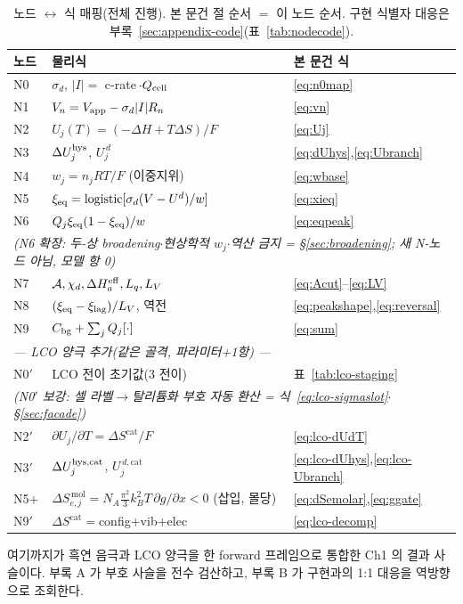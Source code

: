\begin{table}[t]
\centering
\renewcommand{\arraystretch}{1.3}
\caption{노드 $\leftrightarrow$ 식 매핑(전체 진행). 본 문건 절 순서 $=$ 이 노드 순서.
구현 식별자 대응은 부록~\ref{sec:appendix-code}(표~\ref{tab:nodecode}).}
\label{tab:nodemap}
\begin{tabular}{l l l}
\toprule
노드 & 물리식 & 본 문건 식 \\
\midrule
N0 & $\sigma_d$, $|I|=$ c-rate$\,\cdot Q_{\mathrm{cell}}$ & \eqref{eq:n0map} \\
N1 & $V_n=V_{\mathrm{app}}-\sigma_d|I|R_n$ & \eqref{eq:vn} \\
N2 & $U_j(T)=(-\Delta H+T\Delta S)/F$ & \eqref{eq:Uj} \\
N3 & $\Delta U_j^{\mathrm{hys}}$, $U_j^{\,d}$ & \eqref{eq:dUhys},\eqref{eq:Ubranch} \\
N4 & $w_j=n_jRT/F$ (이중지위) & \eqref{eq:wbase} \\
N5 & $\xi_{\mathrm{eq}}=\mathrm{logistic}[\sigma_d(V-U^d)/w]$ & \eqref{eq:xieq} \\
N6 & $Q_j\xi_{\mathrm{eq}}(1-\xi_{\mathrm{eq}})/w$ & \eqref{eq:eqpeak} \\
\multicolumn{3}{l}{\emph{\quad(N6 확장: 두-상 broadening$\cdot$현상학적 $w_j$$\cdot$역산 금지 = \S\ref{sec:broadening}; 새 N-노드 아님, 모델 항 0)}}\\
N7 & $\mathcal A,\chi_d,\Delta H_a^{\mathrm{eff}},L_q,L_V$ & \eqref{eq:Acut}--\eqref{eq:LV} \\
N8 & $(\xi_{\mathrm{eq}}-\xi_\mathrm{lag})/L_V$, 역전 & \eqref{eq:peakshape},\eqref{eq:reversal} \\
N9 & $C_{\mathrm{bg}}+\sum_jQ_j[\cdot]$ & \eqref{eq:sum} \\
\midrule
\multicolumn{3}{l}{\emph{— LCO 양극 추가(같은 골격, 파라미터+1항) —}}\\
N0$'$ & LCO 전이 초기값(3 전이) & 표~\ref{tab:lco-staging} \\
\multicolumn{3}{l}{\emph{\quad(N0$'$ 보강: 셀 라벨$\to$탈리튬화 부호 자동 환산 = 식~\eqref{eq:lco-sigmaslot}$\cdot$\S\ref{sec:facade})}}\\
N2$'$ & $\partial U_j/\partial T=\Delta S^\mathrm{cat}/F$ & \eqref{eq:lco-dUdT} \\
N3$'$ & $\Delta U_j^{\mathrm{hys},\mathrm{cat}}$, $U_j^{\,d,\mathrm{cat}}$ & \eqref{eq:lco-dUhys},\eqref{eq:lco-Ubranch} \\
N5$+$ & $\Delta S_{e,j}^{\,\mathrm{mol}}=N_A\tfrac{\pi^2}{3}k_B^2T\,\partial g/\partial x<0$ (삽입, 몰당) & \eqref{eq:dSemolar},\eqref{eq:ggate} \\
N9$'$ & $\Delta S^\mathrm{cat}=$config$+$vib$+$elec & \eqref{eq:lco-decomp} \\
\bottomrule
\end{tabular}
\end{table}

여기까지가 흑연 음극과 LCO 양극을 한 forward 프레임으로 통합한 Ch1 의 결과 사슬이다. 부록 A 가 부호 사슬을
전수 검산하고, 부록 B 가 구현과의 1:1 대응을 역방향으로 조회한다.

